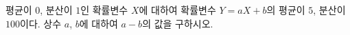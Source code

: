 평균이 $0$, 분산이 $1$인 확률변수 $X$에 대하여 확률변수 $Y=aX+b$의 평균이 $5$, 분산이 $100$이다. 상수 $a$, $b$에 대하여 $a-b$의 값을 구하시오. 
